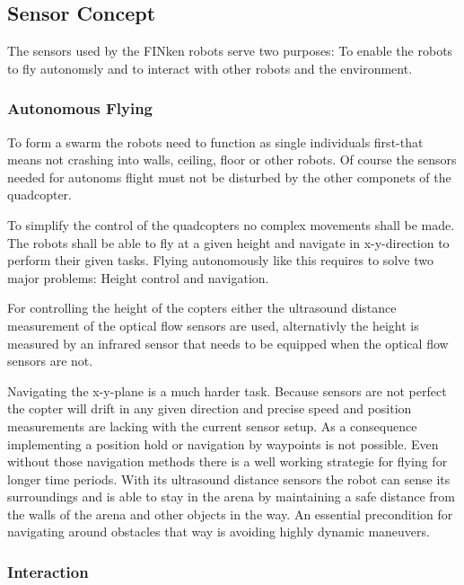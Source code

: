 \subsection{Sensor Concept}
The sensors used by the FINken robots serve two purposes: To enable the robots to fly autonomsly and to interact with other robots and the environment.

\subsubsection{Autonomous Flying}
To form a swarm the robots need to function as single individuals first-that means not crashing into walls, ceiling, floor or other robots.
Of course the sensors needed for autonoms flight must not be disturbed by the other componets of the quadcopter.

To simplify the control of the quadcopters no complex movements shall be made.
The robots shall be able to fly at a given height and navigate in x-y-direction to perform their given tasks.
Flying autonomously like this requires to solve two major problems: Height control and navigation.

For controlling the height of the copters either the ultrasound distance measurement of the optical flow sensors are used, alternativly the height is measured by an infrared sensor that needs to be equipped when the optical flow sensors are not.


Navigating the x-y-plane is a much harder task.
Because sensors are not perfect the copter will drift in any given direction and precise speed and position measurements are lacking with the current sensor setup.
As a consequence implementing a position hold or navigation by waypoints is not possible.
Even without those navigation methods there is a well working strategie for flying for longer time periods.
With its ultrasound distance sensors the robot can sense its surroundings and is able to stay in the arena by maintaining a safe distance from the walls of the arena and other objects in the way. 
An essential precondition for navigating around obstacles that way is avoiding highly dynamic maneuvers.

\subsubsection{Interaction}

